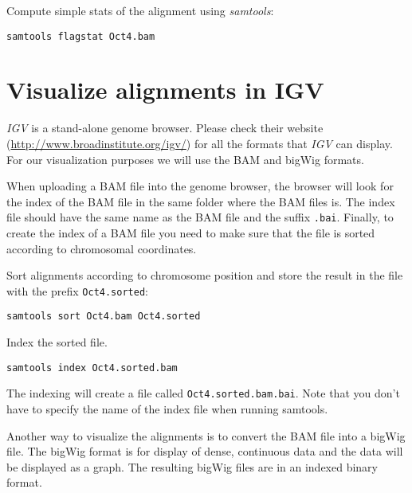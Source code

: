 \begin{advanced}
Compute simple stats of the alignment using \emph{samtools}:

\begin{lstlisting}
samtools flagstat Oct4.bam
\end{lstlisting}
\end{advanced}

\section{Visualize alignments in IGV}

\begin{information}
\emph{IGV} is a stand-alone genome browser. Please check their website
(\url{http://www.broadinstitute.org/igv/}) for all the formats that \emph{IGV}
can display. For our visualization purposes we will use the BAM and bigWig
formats.
\end{information}

\begin{note}
When uploading a BAM file into the genome browser, the browser will look for the
index of the BAM file in the same folder where the BAM files is. The index file
should have the same name as the BAM file and the suffix \texttt{.bai}. Finally, to
create the index of a BAM file you need to make sure that the file is sorted
according to chromosomal coordinates.
\end{note}

\begin{steps}
Sort alignments according to chromosome position and store the result in the
file with the prefix \texttt{Oct4.sorted}:

\begin{lstlisting}
samtools sort Oct4.bam Oct4.sorted
\end{lstlisting}

Index the sorted file.

\begin{lstlisting}
samtools index Oct4.sorted.bam
\end{lstlisting}

The indexing will create a file called \texttt{Oct4.sorted.bam.bai}. Note that
you don't have to specify the name of the index file when running samtools.
\end{steps}

\begin{note}
Another way to visualize the alignments is to convert the BAM file into a bigWig
file. The bigWig format is for display of dense, continuous data and the data
will be displayed as a graph. The resulting bigWig files are in an indexed
binary format.
\end{note}

